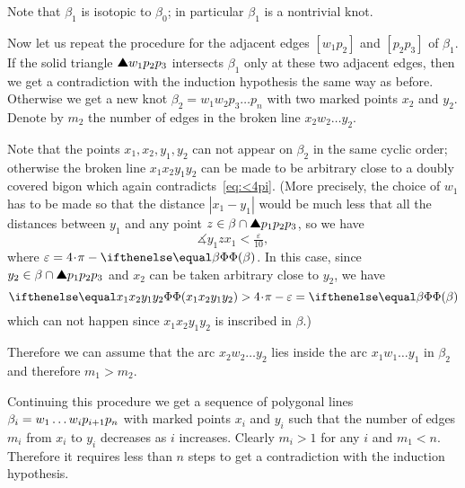 Note that $\beta_1$ is isotopic to $\beta_0$;
in particular $\beta_1$ is a nontrivial knot.

Now let us repeat the procedure for the adjacent edges $[w_1p_2]$ and $[p_2p_3]$ of $\beta_1$.
If the solid triangle $\solidtriangle w_1p_2p_3$ intersects $\beta_1$ only at these two adjacent edges, then we get a contradiction with the induction hypothesis the same way as before.
Otherwise we get a new knot $\beta_2=w_1w_2p_3\dots p_n$ with two marked points $x_2$ and $y_2$.
Denote by $m_2$ the number of edges in the broken line $x_2w_2\dots y_2$.

Note that the points $x_1,x_2,y_1,y_2$ can not appear on $\beta_2$ in the same cyclic order;
otherwise the broken line $x_1x_2y_1y_2$ can be made to be arbitrary close to a doubly covered bigon which again contradicts~\ref{eq:<4pi}.
(More precisely, the choice of $w_1$ has to be made so that the distance $|x_1-y_1|$ would be much less that all the distances between $y_1$ and any point $z\in\beta\cap \solidtriangle p_1p_2p_3$, so we have
\[\measuredangle y_1zx_1<\tfrac\varepsilon{10},\]
where $\varepsilon=4\cdot\pi-\tc\beta$.
In this case, since $y_2\in \beta\cap \solidtriangle p_1p_2p_3$ and $x_2$ can be taken arbitrary close to $y_2$, we have
\[\tc{x_1x_2y_1y_2 }> 4\cdot\pi -\varepsilon= \tc\beta\]
which can not happen since $x_1x_2y_1y_2$ is inscribed in $\beta$.)

Therefore we can assume that the arc $x_2w_2\dots y_2$ lies inside the arc $x_1w_1\dots y_1$ in $\beta_2$
and therefore $m_1>m_2$.

Continuing this procedure we get a sequence of polygonal lines $\beta_i\z=w_1\dots w_i p_{i+1}p_n$ with marked points $x_i$ and $y_i$ such that the number of edges $m_i$ from $x_i$ to $y_i$ decreases as $i$ increases.
Clearly $m_i>1$ for any $i$ and $m_1<n$.
Therefore it requires less than $n$ steps to get a contradiction with the induction hypothesis.
\qeds


